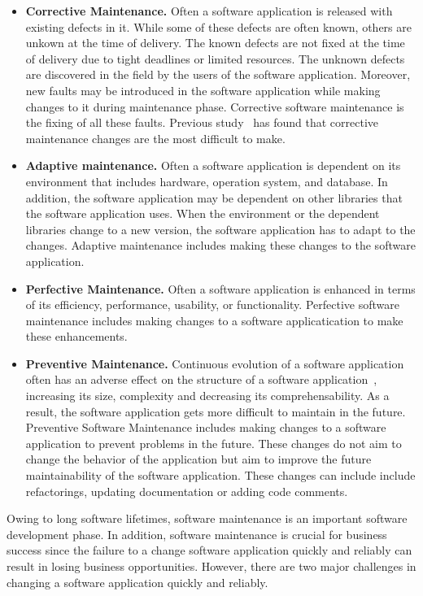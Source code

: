 \begin{itemize}
\item \textbf{Corrective Maintenance.} Often a software application is released with existing defects in it. While some of these defects are often known, others are unkown at the time of delivery. The known defects are not fixed at the time of delivery due to tight deadlines or limited resources. The unknown defects are discovered in the field by the users of the software application. 
Moreover, new faults may be introduced in the software application while making changes to it during maintenance phase. Corrective software maintenance is the fixing of all these faults. Previous study~\cite{Mockus:2000} has found that corrective maintenance changes are the most difficult to make.

\item \textbf{Adaptive maintenance.} Often a software application is dependent on its environment that includes hardware, operation system, and database. In addition, the software application may be dependent on other libraries that the software application uses. When the environment or the dependent libraries change to a new version, the software application has to adapt to the changes. Adaptive maintenance includes making these changes to the software application.

\item \textbf{Perfective Maintenance.} 
Often a software application is enhanced in terms of its efficiency, performance, usability, or functionality. Perfective software maintenance includes making changes to a software applicatication to make these enhancements.

\item \textbf{Preventive Maintenance.}  
Continuous evolution of a software application often has an adverse effect on the structure of a software application~\cite{lehman:1985}, increasing its size, complexity and decreasing its comprehensability. As a result, the software application gets more difficult to maintain in the future. 
Preventive Software Maintenance includes making changes to a software application to prevent problems in the future. These changes 
do not aim to change the behavior of the application but aim to improve the future maintainability of the software application. 
These changes can include include refactorings, updating documentation or adding code comments.
\end{itemize}
Owing to long software lifetimes, software maintenance is an important software development phase. In addition, software maintenance is crucial for business success since the failure to a change software application quickly and reliably can result in losing business opportunities. However, there are two major challenges in changing a software application quickly and reliably.

